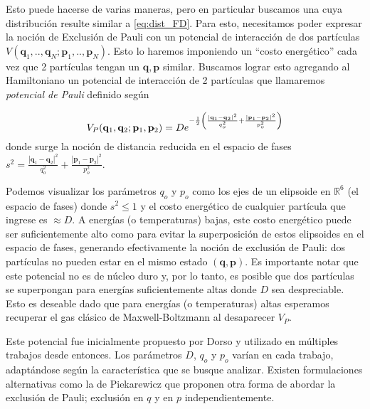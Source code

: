 Esto puede hacerse de varias maneras, pero en particular buscamos una cuya distribución resulte similar a \eqref{eq:dist_FD}.
Para esto, necesitamos poder expresar la noción de Exclusión de Pauli con un potencial de interacción de dos partículas $V(\mathbf{q}_1,..,\mathbf{q}_N;\mathbf{p}_1,..,\mathbf{p}_N)$.
Esto lo haremos imponiendo un ``costo energético'' cada vez que 2 partículas tengan un $\mathbf{q}, \mathbf{p}$ similar.
Buscamos lograr esto agregando al Hamiltoniano un potencial de interacción de 2 partículas que llamaremos \textit{potencial de Pauli} definido según

\begin{equation}{\label{eq:def_int_pauli}}
 V_P(\mathbf{q}_1,\mathbf{q}_2;\mathbf{p}_1,\mathbf{p}_2) = De^{-\frac{1}{2}\left( \frac{|\mathbf{q}_1-\mathbf{q}_2|^2}{q_o^2} +\frac{|\mathbf{p}_1-\mathbf{p}_2|^2}{p_o^2} \right)}
\end{equation}
donde surge la noción de distancia reducida en el espacio de fases $s^2 = \frac{|\mathbf{q}_1-\mathbf{q}_2|^2}{q_o^2} +\frac{|\mathbf{p}_1-\mathbf{p}_2|^2}{p_o^2}$.

Podemos visualizar los parámetros $q_o$ y $p_o$ como los ejes de un elipsoide en $\mathbb{R}^6$ (el espacio de fases) donde $s^2 \leq 1$ y el costo energético de cualquier partícula
que ingrese es $\approx D$.
A energías (o temperaturas) bajas, este costo energético puede ser suficientemente alto como para evitar la superposición de estos elipsoides en el espacio de fases, generando efectivamente
la noción de exclusión de Pauli: dos partículas no pueden estar en el mismo estado $(\mathbf{q}, \mathbf{p})$.
Es importante notar que este potencial no es de núcleo duro y, por lo tanto, es posible que dos partículas se superpongan para energías suficientemente altas donde $D$ sea despreciable.
Esto es deseable dado que para energías (o temperaturas) altas esperamos recuperar el gas clásico de Maxwell-Boltzmann al desaparecer $V_P$.

Este potencial fue inicialmente propuesto por Dorso \cite{Dorso1987, Dorso1988, Dorso1993} y utilizado en múltiples trabajos desde entonces\cite{Maruyama2012, Taruna2008}.
Los parámetros $D$, $q_o$ y $p_o$ varían en cada trabajo, adaptándose según la característica que se busque analizar.
Existen formulaciones alternativas como la de Piekarewicz \cite{Taruna2008} que proponen otra forma de abordar la exclusión de Pauli; exclusión en $q$ y en $p$ independientemente.


